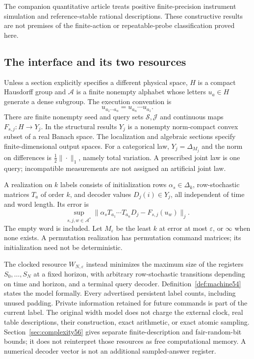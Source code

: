 The companion quantitative article treats positive finite-precision
instrument simulation and reference-stable rational descriptions. These
constructive results are not premises of the finite-action or
repeatable-probe classification proved here.

\subsection{The interface and its two resources}
Unless a section explicitly specifies a different physical space, $H$ is a compact Hausdorff group and $\mathcal A$ is a finite nonempty alphabet whose letters $u_a\in H$ generate a dense subgroup. The execution convention is
\[
                  u_{a_1\cdots a_n}=u_{a_n}\cdots u_{a_1}.
\]
There are finite nonempty seed and query sets $\mathcal S,\mathcal J$ and continuous maps $F_{s,j}:H\to Y_j$. In the structural results $Y_j$ is a nonempty norm-compact convex subset of a real Banach space. The localization and algebraic sections specify finite-dimensional output spaces. For a categorical law, $Y_j=\Delta_{M_j}$ and the norm on differences is $\frac12\|\cdot\|_1$, namely total variation. A prescribed joint law is one query; incompatible measurements are not assigned an artificial joint law.

\begin{definition}\label{def:stationary55}
A realization on $k$ labels consists of initialization rows $\alpha_s\in\Delta_k$, row-stochastic matrices $T_a$ of order $k$, and decoder values $D_j(i)\in Y_j$, all independent of time and word length. Its error is
\[
       \sup_{s,j,w\in\mathcal A^*}
        \|\alpha_sT_{a_1}\cdots T_{a_n}D_j-F_{s,j}(u_w)\|_j.
\]
The empty word is included. Let $M_\varepsilon$ be the least $k$ at error at most $\varepsilon$, or $\infty$ when none exists. A permutation realization has permutation command matrices; its initialization need not be deterministic.
\end{definition}
The clocked resource $W_{N,\varepsilon}$ instead minimizes the maximum size of the registers $S_0,\ldots,S_N$ at a fixed horizon, with arbitrary row-stochastic transitions depending on time and horizon, and a terminal query decoder. Definition~\ref{def:machine54} states the model formally. Every advertised persistent label counts, including unused padding. Private information retained for future commands is part of the current label. The original width model does not charge the external clock, real table descriptions, their construction, exact arithmetic, or exact atomic sampling. Section~\ref{sec:complexity56} gives separate finite-description and fair-random-bit bounds; it does not reinterpret those resources as free computational memory. A numerical decoder vector is not an additional sampled-answer register.

